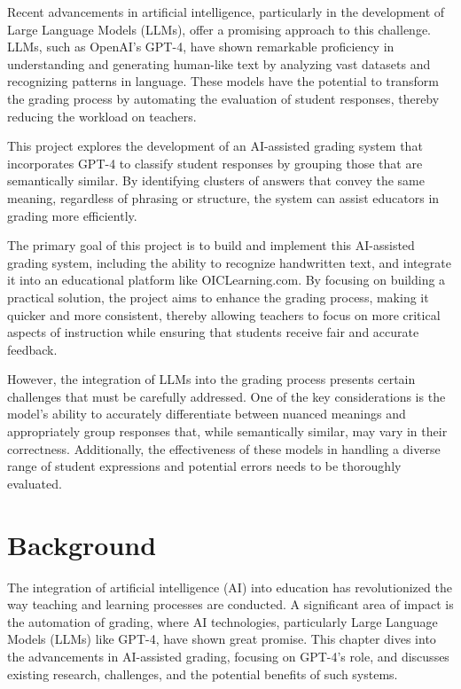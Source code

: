 \documentclass[ms,twoside,print]{nuthesis}
\begin{document}
Recent advancements in artificial intelligence, particularly in the development of Large Language Models (LLMs), offer a promising approach to this challenge. LLMs, such as OpenAI's GPT-4, have shown remarkable proficiency in understanding and generating human-like text by analyzing vast datasets and recognizing patterns in language. These models have the potential to transform the grading process by automating the evaluation of student responses, thereby reducing the workload on teachers.

This project explores the development of an AI-assisted grading system that incorporates GPT-4 to classify student responses by grouping those that are semantically similar. By identifying clusters of answers that convey the same meaning, regardless of phrasing or structure, the system can assist educators in grading more efficiently.

The primary goal of this project is to build and implement this AI-assisted grading system, including the ability to recognize handwritten text, and integrate it into an educational platform like OICLearning.com. By focusing on building a practical solution, the project aims to enhance the grading process, making it quicker and more consistent, thereby allowing teachers to focus on more critical aspects of instruction while ensuring that students receive fair and accurate feedback.

However, the integration of LLMs into the grading process presents certain challenges that must be carefully addressed. One of the key considerations is the model's ability to accurately differentiate between nuanced meanings and appropriately group responses that, while semantically similar, may vary in their correctness. Additionally, the effectiveness of these models in handling a diverse range of student expressions and potential errors needs to be thoroughly evaluated.

\chapter{Background}

The integration of artificial intelligence (AI) into education has revolutionized the way teaching and learning processes are conducted. A significant area of impact is the automation of grading, where AI technologies, particularly Large Language Models (LLMs) like GPT-4, have shown great promise. This chapter dives into the advancements in AI-assisted grading, focusing on GPT-4's role, and discusses existing research, challenges, and the potential benefits of such systems.
\end{document}
